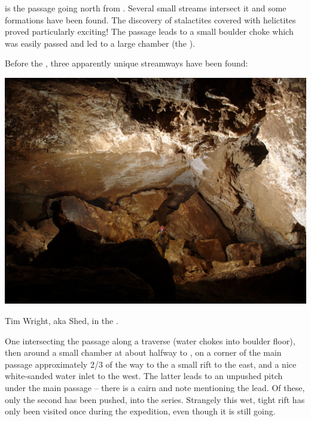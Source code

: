  is the passage going north from
. Several small streams intersect it and some formations
have been found. The discovery of stalactites covered with helictites
proved particularly exciting! The passage leads to a small boulder choke
which was easily passed and led to a large chamber (the ).

Before the , three apparently unique streamways have been found:


\begin{pagefigure}
\checkoddpage \ifoddpage \forcerectofloat \else \forceversofloat \fi
   \centering
\includegraphics[width = \textwidth]{2010/expo_findings/20100731-21-53-00-Jarvist Frost-Canon G5-CRW_0402-Albert Hall - Prince Consort Road--orig.jpg}
\caption{Tim Wright, aka Shed, in the \protect{}. } \label{Albert Hall}
\end{pagefigure}


One intersecting the passage along a traverse (water chokes into boulder floor), then around a small chamber at about halfway to , on a corner of the main passage approximately 2/3 of the way to
the  a small rift to the east, and a nice white-sanded water inlet to the west. The latter leads to an unpushed pitch under the main passage -- there is a cairn and note mentioning the lead. Of these,
only the second has been pushed, into the  series. Strangely this wet, tight rift has only been visited once during the
expedition, even though it is still going.

